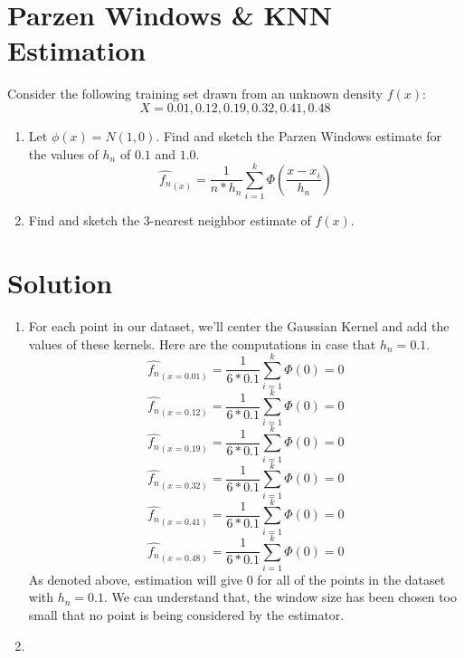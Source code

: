 \documentclass[12pt]{article}
\numberwithin{equation}{section}
\numberwithin{table}{section}
\numberwithin{figure}{section}
\begin{document}
\section{Parzen Windows \& KNN Estimation}
Consider the following training set drawn from an unknown density $f(x)$:
$$
	X = { 0.01, 0.12, 0.19, 0.32, 0.41, 0.48}
$$
\begin{enumerate}[label=(\alph*)]
		
	\item	Let $\phi(x) = N(1, 0)$. Find and sketch the Parzen Windows estimate for the values of $h_n$ of $0.1$ and $1.0$.
	\begin{equation}
	\hat{f_n}_{(x)} = \frac{1}{n*h_n} \sum_{i = 1}^{k}\Phi(\frac{x - x_i}{h_n})
	\end{equation}
	
	
	\item Find and sketch the 3-nearest neighbor estimate of $f(x)$.
\end{enumerate}

\section*{Solution}

\begin{enumerate}[label=(\alph*)]
	\item For each point in our dataset, we'll center the Gaussian Kernel and add the values of these kernels. Here are the computations in case that $h_n = 0.1$.
	$$
	\hat{f_n}_{(x = 0.01)} = \frac{1}{6*0.1} \sum_{i = 1}^{k}\Phi(0) = 0
	$$
	$$
	\hat{f_n}_{(x = 0.12)} = \frac{1}{6*0.1} \sum_{i = 1}^{k}\Phi(0) = 0
	$$
	$$
	\hat{f_n}_{(x = 0.19)} = \frac{1}{6*0.1} \sum_{i = 1}^{k}\Phi(0) = 0
	$$
	$$
	\hat{f_n}_{(x = 0.32)} = \frac{1}{6*0.1} \sum_{i = 1}^{k}\Phi(0) = 0
	$$
	$$
	\hat{f_n}_{(x = 0.41)} = \frac{1}{6*0.1} \sum_{i = 1}^{k}\Phi(0) = 0
	$$
	$$
	\hat{f_n}_{(x = 0.48)} = \frac{1}{6*0.1} \sum_{i = 1}^{k}\Phi(0) = 0
	$$
	As denoted above, estimation will give 0 for all of the points in the dataset with $h_n = 0.1$. We can understand that, the window size has been chosen too small that no point is being considered by the estimator.
	
	\item
\end{enumerate}
\end{document}
